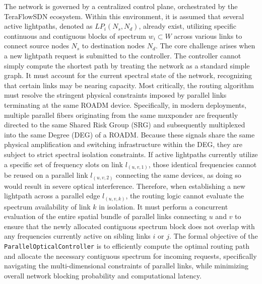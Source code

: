 The network is governed by a centralized control plane, orchestrated by the TeraFlowSDN ecosystem. Within this environment, it is assumed that several active lightpaths, denoted as $LP_i(N_s, N_d)$, already exist, utilizing specific continuous and contiguous blocks of spectrum $w_i\subset W$ across various links to connect source nodes $N_s$ to destination nodes $N_d$. The core challenge arises when a new lightpath request is submitted to the controller. The controller cannot simply compute the shortest path by treating the network as a standard simple graph. It must account for the current spectral state of the network, recognizing that certain links may be nearing capacity. Most critically, the routing algorithm must resolve the stringent physical constraints imposed by parallel links terminating at the same ROADM device. Specifically, in modern deployments, multiple parallel fibers originating from the same muxponder are frequently directed to the same Shared Risk Group (SRG) and subsequently multiplexed into the same Degree (DEG) of a ROADM. Because these signals share the same physical amplification and switching infrastructure within the DEG, they are subject to strict spectral isolation constraints. If active lightpaths currently utilize a specific set of frequency slots on link $l_(u,v,1)$, those identical frequencies cannot be reused on a parallel link $l_(u,v,2)$ connecting the same devices, as doing so would result in severe optical interference. Therefore, when establishing a new lightpath across a parallel edge $l_(u,v,k)$, the routing logic cannot evaluate the spectrum availability of link $k$ in isolation. It must perform a concurrent evaluation of the entire spatial bundle of parallel links connecting $u$ and $v$ to ensure that the newly allocated contiguous spectrum block does not overlap with any frequencies currently active on sibling links $i$ or $j$. The formal objective of the \texttt{ParallelOpticalController} is to efficiently compute the optimal routing path and allocate the necessary contiguous spectrum for incoming requests, specifically navigating the multi-dimensional constraints of parallel links, while minimizing overall network blocking probability and computational latency.
